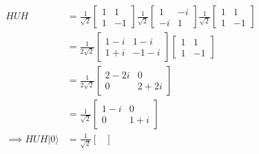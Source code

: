 \begin{align*}
    HUH                   & = \frac{1}{\sqrt{2}}\begin{bmatrix}
                                                    1 & 1  \\
                                                    1 & -1
                                                \end{bmatrix}
    \frac{1}{\sqrt{2}}\begin{bmatrix}
                          1  & -i \\
                          -i & 1
                      \end{bmatrix}
    \frac{1}{\sqrt{2}}\begin{bmatrix}
                          1 & 1  \\
                          1 & -1
                      \end{bmatrix}                             \\
                          & = \frac{1}{2\sqrt{2}}\begin{bmatrix}
                                                     1 - i & 1 - i  \\
                                                     1 + i & -1 - i
                                                 \end{bmatrix}
    \begin{bmatrix}
        1 & 1  \\
        1 & -1
    \end{bmatrix}                                               \\
                          & = \frac{1}{2\sqrt{2}}\begin{bmatrix}
                                                     2 - 2i & 0      \\
                                                     0      & 2 + 2i
                                                 \end{bmatrix} \\
                          & = \frac{1}{\sqrt{2}}\begin{bmatrix}
                                                    1 - i & 0     \\
                                                    0     & 1 + i
                                                \end{bmatrix}   \\
    \implies HUH|0\rangle & = \frac{1}{\sqrt{2}}\begin{bmatrix}

\end{bmatrix}
\end{align*}
